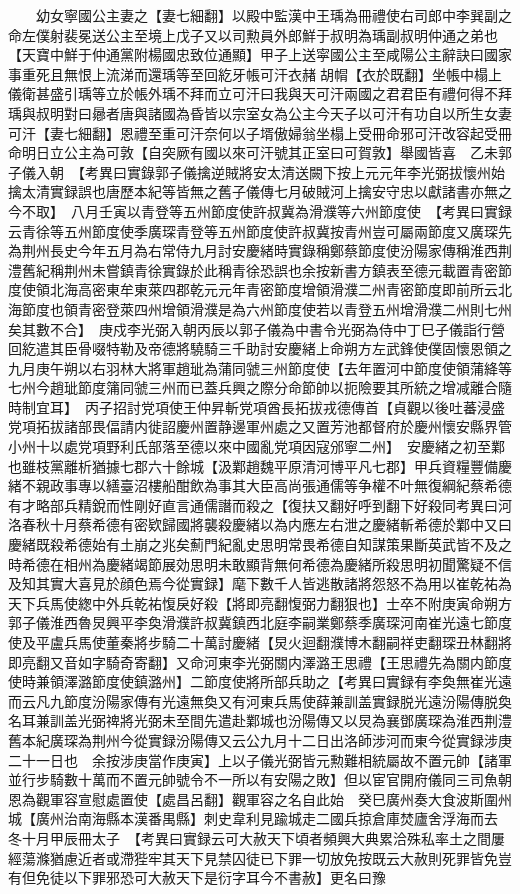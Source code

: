 　　幼女寧國公主妻之【妻七細翻】以殿中監漢中王瑀為冊禮使右司郎中李巽副之命左僕射裴冕送公主至境上戊子又以司勲員外郎鮮于叔明為瑀副叔明仲通之弟也【天寶中鮮于仲通黨附楊國忠致位通顯】甲子上送寜國公主至咸陽公主辭訣曰國家事重死且無恨上流涕而還瑀等至回紇牙帳可汗衣赭胡㡌【衣於既翻】坐帳中榻上儀衛甚盛引瑀等立於帳外瑀不拜而立可汗曰我與天可汗兩國之君君臣有禮何得不拜瑀與叔明對曰曏者唐與諸國為昏皆以宗室女為公主今天子以可汗有功自以所生女妻可汗【妻七細翻】恩禮至重可汗奈何以子壻傲婦翁坐榻上受冊命邪可汗改容起受冊命明日立公主為可敦【自突厥有國以來可汗號其正室曰可賀敦】舉國皆喜　乙未郭子儀入朝　【考異曰實錄郭子儀擒逆賊將安太清送闕下按上元元年李光弼拔懷州始擒太清實録誤也唐歷本紀等皆無之舊子儀傳七月破賊河上擒安守忠以獻諸書亦無之今不取】　八月壬寅以青登等五州節度使許叔冀為滑濮等六州節度使　【考異曰實録云青徐等五州節度使季廣琛青登等五州節度使許叔冀按青州豈可屬兩節度又廣琛先為荆州長史今年五月為右常侍九月討安慶緒時實錄稱鄭蔡節度使汾陽家傳稱淮西荆澧舊紀稱荆州未嘗鎮青徐實錄於此稱青徐恐誤也余按新書方鎮表至德元載置青密節度使領北海高密東牟東萊四郡乾元元年青密節度增領滑濮二州青密節度即前所云北海節度也領青密登萊四州增領滑濮是為六州節度使若以青登五州增滑濮二州則七州矣其數不合】　庚戍李光弼入朝丙辰以郭子儀為中書令光弼為侍中丁巳子儀詣行營　回紇遣其臣骨啜特勒及帝德將驍騎三千助討安慶緒上命朔方左武鋒使僕固懷恩領之　九月庚午朔以右羽林大將軍趙玼為蒲同虢三州節度使【去年置河中節度使領蒲絳等七州今趙玼節度䈬同虢三州而已蓋兵興之際分命節帥以扼險要其所統之增减離合隨時制宜耳】　丙子招討党項使王仲昇斬党項酋長拓拔戎德傳首【貞觀以後吐蕃浸盛党項拓拔諸部畏偪請内徙詔慶州置静邊軍州處之又置芳池都督府於慶州懷安縣界管小州十以處党項野利氏部落至德以來中國亂党項因寇邠寧二州】　安慶緒之初至鄴也雖枝黨離析猶據七郡六十餘城【汲鄴趙魏平原清河博平凡七郡】甲兵資糧豐備慶緒不親政事專以繕臺沼樓船酣飲為事其大臣高尚張通儒等争權不叶無復綱紀蔡希德有才略部兵精銳而性剛好直言通儒譖而殺之【復扶又翻好呼到翻下好殺同考異曰河洛春秋十月蔡希德有密欵歸國將襲殺慶緒以為内應左右泄之慶緒斬希德於鄴中又曰慶緒既殺希德始有土崩之兆矣薊門紀亂史思明常畏希德自知謀策果斷英武皆不及之時希德在相州為慶緒竭節展効思明未敢顯背無何希德為慶緒所殺思明初聞驚疑不信及知其實大喜見於顔色焉今從實録】麾下數千人皆逃散諸將怨怒不為用以崔乾祐為天下兵馬使緫中外兵乾祐愎戾好殺【將即亮翻愎弼力翻狠也】士卒不附庚寅命朔方郭子儀淮西魯炅興平李奐滑濮許叔冀鎮西北庭李嗣業鄭蔡季廣琛河南崔光遠七節度使及平盧兵馬使董秦將步騎二十萬討慶緒【炅火迴翻濮博木翻嗣祥吏翻琛丑林翻將即亮翻又音如字騎奇寄翻】又命河東李光弼關内澤潞王思禮【王思禮先為關内節度使時兼領澤潞節度使鎮潞州】二節度使將所部兵助之【考異曰實録有李奐無崔光遠而云凡九節度汾陽家傳有光遠無奐又有河東兵馬使薛兼訓盖實録脱光遠汾陽傳脱奐名耳兼訓盖光弼禆將光弼未至間先遣赴鄴城也汾陽傳又以炅為襄鄧廣琛為淮西荆澧舊本紀廣琛為荆州今從實録汾陽傳又云公九月十二日出洛師涉河而東今從實録涉庚二十一日也　余按涉庚當作庚寅】上以子儀光弼皆元勲難相統屬故不置元帥【諸軍並行步騎數十萬而不置元帥號令不一所以有安陽之敗】但以宦官開府儀同三司魚朝恩為觀軍容宣慰處置使【處昌呂翻】觀軍容之名自此始　癸巳廣州奏大食波斯圍州城【廣州治南海縣本漢番禺縣】刺史韋利見踰城走二國兵掠倉庫焚廬舍浮海而去　冬十月甲辰冊太子　【考異曰實録云可大赦天下頃者頻興大典累洽殊私率土之間屢經蕩滌猶慮近者或滯狴牢其天下見禁囚徒已下罪一切放免按既云大赦則死罪皆免豈有但免徒以下罪邪恐可大赦天下是衍字耳今不書赦】更名曰豫